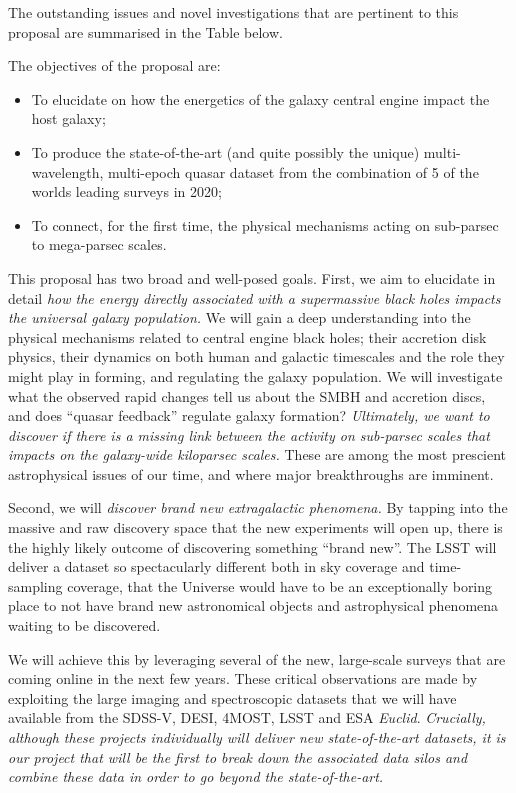 \smallskip
\smallskip
\noindent
The outstanding issues and novel investigations 
that are pertinent to this proposal are summarised in the Table below. 

\smallskip
\smallskip
\noindent



\noindent
The objectives of the proposal are:
\begin{itemize}
\item To elucidate on how the energetics of the galaxy central engine impact the host galaxy;
\item To produce the state-of-the-art (and quite possibly the unique) multi-wavelength, multi-epoch 
quasar dataset from the combination of 5 of the worlds leading surveys in 2020; 
\item To connect, for the first time, the physical mechanisms acting on sub-parsec to mega-parsec scales. 
\end{itemize}

\smallskip
\smallskip
\noindent
This proposal has two broad and well-posed goals.  
First, we aim to
elucidate in detail {\it how the energy directly associated with a
supermassive black holes impacts the universal galaxy population.}  We
will gain a deep understanding into the physical mechanisms related to
central engine black holes; their accretion disk physics, their
dynamics on both human and galactic timescales and the role they might
play in forming, and regulating the galaxy population. 
We will investigate what the observed rapid changes tell us about the SMBH and accretion discs, 
and does ``quasar feedback'' regulate galaxy formation?
{\it Ultimately, we want to discover if there is a missing link between the 
activity on sub-parsec scales that impacts on the galaxy-wide kiloparsec scales.}
These are among the most prescient astrophysical issues of our time, 
and where major breakthroughs are imminent.

\smallskip
\smallskip
\noindent
Second, we will {\it discover brand new extragalactic phenomena.}  By
tapping into the massive and raw discovery space that the new
experiments will open up, there is the highly likely outcome of
discovering something ``brand new''. The LSST will deliver a dataset
so spectacularly different both in sky coverage and time-sampling
coverage, that the Universe would have to be an exceptionally boring
place to not have brand new astronomical objects and astrophysical
phenomena waiting to be discovered.

\smallskip
\smallskip
\noindent
We will achieve this by leveraging several of the new, large-scale
surveys that are coming online in the next few years. These critical
observations are made by exploiting the large imaging and
spectroscopic datasets that we will have available from the SDSS-V,
DESI, 4MOST, LSST and ESA {\it Euclid}. {\it Crucially, although these 
projects individually will deliver new state-of-the-art datasets, it is 
our project that will be the first to break down the associated data 
silos and combine these data in order to go beyond the state-of-the-art.}

